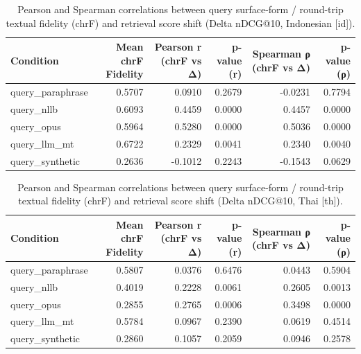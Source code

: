 \begin{table}
\caption{Pearson and Spearman correlations between query surface-form / round-trip textual fidelity (chrF) and retrieval score shift (Delta nDCG@10, Indonesian [id]).}
\label{tab:translation_correlations_id}
\begin{tabular}{lrrrrr}
\toprule
Condition & Mean chrF Fidelity & Pearson r (chrF vs Δ) & p-value (r) & Spearman ρ (chrF vs Δ) & p-value (ρ) \\
\midrule
query_paraphrase & 0.5707 & 0.0910 & 0.2679 & -0.0231 & 0.7794 \\
query_nllb & 0.6093 & 0.4459 & 0.0000 & 0.4457 & 0.0000 \\
query_opus & 0.5964 & 0.5280 & 0.0000 & 0.5036 & 0.0000 \\
query_llm_mt & 0.6722 & 0.2329 & 0.0041 & 0.2340 & 0.0040 \\
query_synthetic & 0.2636 & -0.1012 & 0.2243 & -0.1543 & 0.0629 \\
\bottomrule
\end{tabular}
\end{table}


\begin{table}
\caption{Pearson and Spearman correlations between query surface-form / round-trip textual fidelity (chrF) and retrieval score shift (Delta nDCG@10, Thai [th]).}
\label{tab:translation_correlations_th}
\begin{tabular}{lrrrrr}
\toprule
Condition & Mean chrF Fidelity & Pearson r (chrF vs Δ) & p-value (r) & Spearman ρ (chrF vs Δ) & p-value (ρ) \\
\midrule
query_paraphrase & 0.5807 & 0.0376 & 0.6476 & 0.0443 & 0.5904 \\
query_nllb & 0.4019 & 0.2228 & 0.0061 & 0.2605 & 0.0013 \\
query_opus & 0.2855 & 0.2765 & 0.0006 & 0.3498 & 0.0000 \\
query_llm_mt & 0.5784 & 0.0967 & 0.2390 & 0.0619 & 0.4514 \\
query_synthetic & 0.2860 & 0.1057 & 0.2059 & 0.0946 & 0.2578 \\
\bottomrule
\end{tabular}
\end{table}



